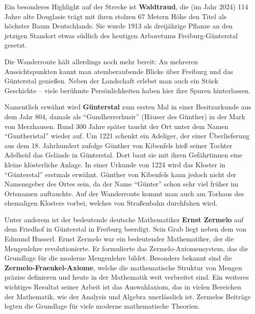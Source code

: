 \documentclass[landscape, a4paper]{article}
\newcommand\alert[1]{\textcolor{PrimaryColor}{\textbf{#1}}}
\begin{document}
\begin{minipage}[t]{0.31\textwidth}
	Ein besonderes Highlight auf der Strecke ist \alert{Waldtraud}, die (im Jahr 2024) 114 Jahre alte Douglasie trägt mit ihren stolzen 67 Metern Höhe den Titel als höchster Baum Deutschlands. Sie wurde 1913 als dreijährige Pflanze an den jetzigen Standort etwas südlich des heutigen Arboretums Freiburg-Günterstal gesetzt.

	Die Wanderroute hält allerdings noch mehr bereit: An mehreren Aussichtspunkten kannt man atemberaubende Blicke über Freiburg und das Günterstal genießen. Neben der Landschaft erlebst man auch ein Stück Geschichte – viele berühmte Persönlichkeiten haben hier ihre Spuren hinterlassen.
\end{minipage}%
\hfill\color{white}%
\vrule width 0.01cm
\hfill\color{black}%
\begin{minipage}[t]{0.31\textwidth}
	\setlength{\parskip}{0.25cm}

	Namentlich erwähnt wird \alert{Günterstal} zum ersten Mal in einer Besitzurkunde aus dem Jahr 804, damals als \enquote{Gundherrerhusir} (Häuser des Günther) in der Mark von Merzhausen. Rund 300 Jahre später taucht der Ort unter dem Namen \enquote{Guntheristal} wieder auf. Um 1221 schenkt ein Adeliger, der einer Überlieferung aus dem 18. Jahrhundert zufolge Günther von Kibenfels hieß seiner Tochter Adelheid das Gelände in Günterstal. Dort baut sie mit ihren Gefährtinnen eine kleine klösterliche Anlage. In einer Urkunde von 1224 wird das Kloster in \enquote{Günterstal} erstmals erwähnt. Günther von Kibenfels kann jedoch nicht der Namensgeber des Ortes sein, da der Name \enquote{Günter} schon sehr viel früher im Ortsnamen auftauchte. Auf der Wanderroute kommt man auch am Torhaus des ehemaligen Klosters vorbei, welches von Straßenbahn durchfahen wird.

	Unter anderem ist der bedeutende deutsche Mathematiker \alert{Ernst Zermelo} auf dem Friedhof in Günterstal in Freiburg beerdigt. Sein Grab liegt neben dem von Edmund Husserl. Ernst Zermelo war ein bedeutender Mathematiker, der die Mengenlehre revolutionierte. Er formulierte das Zermelo-Axiomensystem, das die Grundlage für die moderne Mengenlehre bildet. Besonders bekannt sind die \alert{Zermelo-Fraenkel-Axiome}, welche die mathematische Struktur von Mengen präzise definieren und heute in der Mathematik weit verbreitet sind. Ein weiteres wichtiges Resultat seiner Arbeit ist das Auswahlaxiom, das in vielen Bereichen der Mathematik, wie der Analysis und Algebra unerlässlich ist. Zermelos Beiträge legten die Grundlage für viele moderne mathematische Theorien.


\end{minipage}
\end{document}
